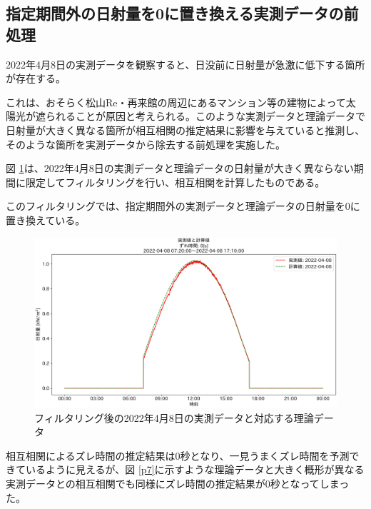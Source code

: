 \documentclass[a4j,12pt,]{jarticle}
\begin{document}
\subsection{指定期間外の日射量を0に置き換える実測データの前処理}
2022年4月8日の実測データを観察すると、日没前に日射量が急激に低下する箇所が存在する。

これは、おそらく松山Re・再来館の周辺にあるマンション等の建物によって太陽光が遮られることが原因と考えられる。このような実測データと理論データで日射量が大きく異なる箇所が相互相関の推定結果に影響を与えていると推測し、そのような箇所を実測データから除去する前処理を実施した。

図 \ref{p6}は、2022年4月8日の実測データと理論データの日射量が大きく異ならない期間に限定してフィルタリングを行い、相互相関を計算したものである。

このフィルタリングでは、指定期間外の実測データと理論データの日射量を0に置き換えている。

\begin{figure}[H]
  \begin{center}
    \includegraphics[width=160mm]{2022-04-08_partial_corr.png}
    \caption{フィルタリング後の2022年4月8日の実測データと対応する理論データ}
    \label{p6}
  \end{center}
\end{figure}

相互相関によるズレ時間の推定結果は0秒となり、一見うまくズレ時間を予測できているように見えるが、図 \ref{p7}に示すような理論データと大きく概形が異なる実測データとの相互相関でも同様にズレ時間の推定結果が0秒となってしまった。
\end{document}

